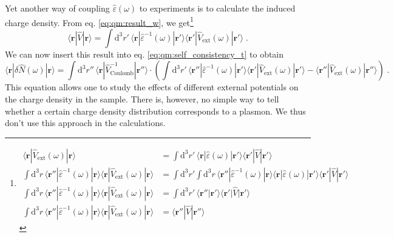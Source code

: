 \documentclass[a4paper,12pt]{article}
\begin{document}
    Yet another way of coupling $\hat\varepsilon(\omega)$ to experiments is to calculate the induced charge density. From eq. \eqref{eq:qm:result_w}, we get\footnote{ %
        \begin{equation*}
        \begin{aligned}
            \langle\mathbf{r} |\hat V_\text{ext}(\omega)| \mathbf{r}\rangle &= \int\!\!\text{d}^3r'\, \langle\mathbf{r} |\hat\varepsilon(\omega)| \mathbf{r'}\rangle\langle\mathbf{r'} |\hat V|\mathbf{r'}\rangle \\
            \int\!\!\text{d}^3r\,\langle\mathbf{r''}|\hat\varepsilon^{-1}(\omega)|\mathbf{r}\rangle\langle\mathbf{r} |\hat V_\text{ext}(\omega)| \mathbf{r}\rangle &= \int\!\!\text{d}^3r'\!\!\!\int\!\!\text{d}^3r\,\langle\mathbf{r''} |\hat\varepsilon^{-1}(\omega) |\mathbf{r}\rangle\langle\mathbf{r} |\hat\varepsilon(\omega)| \mathbf{r'}\rangle\langle\mathbf{r'} |\hat V| \mathbf{r'}\rangle \\
            \int\!\!\text{d}^3r\,\langle\mathbf{r''} |\hat\varepsilon^{-1}(\omega)| \mathbf{r}\rangle \langle\mathbf{r} |\hat V_\text{ext}(\omega)| \mathbf{r}\rangle &= \int\!\!\text{d}^3r'\,\langle\mathbf{r''} | \mathbf{r'}\rangle \langle\mathbf{r'} |\hat V| \mathbf{r'}\rangle \\
            \int\!\!\text{d}^3r\,\langle\mathbf{r''} |\hat\varepsilon^{-1}(\omega)| \mathbf{r}\rangle \langle\mathbf{r} |\hat V_\text{ext}(\omega)| \mathbf{r}\rangle &= \langle\mathbf{r''} |\hat V| \mathbf{r''}\rangle
        \end{aligned}
        \end{equation*}
    }
    \begin{equation*}
        \langle\mathbf{r} |\hat V| \mathbf{r}\rangle = \int\!\!\text{d}^3r'\,\langle\mathbf{r} |\hat\varepsilon^{-1}(\omega)| \mathbf{r'}\rangle \langle\mathbf{r'} |\hat V_\text{ext}(\omega)| \mathbf{r'}\rangle\; .
    \end{equation*}
    We can now insert this result into eq. \eqref{eq:qm:self_consistency_t} to obtain
    \begin{equation} \label{eq:exp:charge_density}
        \langle\mathbf{r} |\delta\hat N(\omega)| \mathbf{r}\rangle = \int\!\!\text{d}^3r''\, \langle\mathbf{r} |\hat V^{-1}_\text{Coulomb}| \mathbf{r''}\rangle \cdot \left( \int\!\!\text{d}^3r'\, \langle\mathbf{r''} |\hat\varepsilon^{-1}(\omega)| \mathbf{r'}\rangle\langle\mathbf{r'} |\hat V_\text{ext}(\omega)| \mathbf{r'}\rangle - \langle\mathbf{r''} |\hat V_\text{ext}(\omega)| \mathbf{r''}\rangle \!\right) \; .
    \end{equation}
    This equation allows one to study the effects of different external potentials on the charge density in the sample. There is, however, no simple way to tell whether a certain charge density distribution corresponds to a plasmon. We thus don't use this approach in the calculations.
\end{document}

